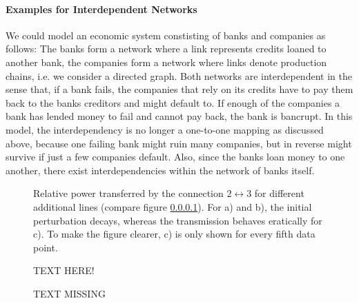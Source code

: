 \documentclass{scrartcl}
\begin{document}
\paragraph{Examples for Interdependent Networks}
We could model an economic system constisting of banks and companies as
follows: The banks form a network where a link represents credits loaned to
another bank, the companies form a network where links denote production
chains, i.e. we consider a directed graph.  Both networks are
interdependent in the sense that, if a bank fails, the companies that rely
on its credits have to pay them back to the banks creditors and might
default to.  If enough of the companies a bank has lended money to fail and
cannot pay back, the bank is bancrupt.  In this model, the interdependency
is no longer a one-to-one mapping as discussed above, because one failing
bank might ruin many companies, but in reverse might survive if just a few
companies default.  Also, since the banks loan money to one another, there
exist interdependencies within the network of banks itself.


\begin{figure}[h]
    \centering
    \caption{Relative power transferred by the connection
        $ 2 \leftrightarrow 3$ for different additional lines (compare
        figure \ref{}). For a) and b), the initial perturbation decays,
        whereas the transmission behaves eratically for c). To make the figure
        clearer, c) is only shown for every fifth data point. }
    \label{fig:B31}
\end{figure}

\begin{figure}
    \centering
    \def\svgwidth{0.32\textwidth}
    
    \caption{TEXT HERE!}
    \label{fig:B13}
\end{figure}

\begin{figure}[h]
    \centering
    \caption{TEXT MISSING}
    \label{fig:B32}
\end{figure}
\end{document}
